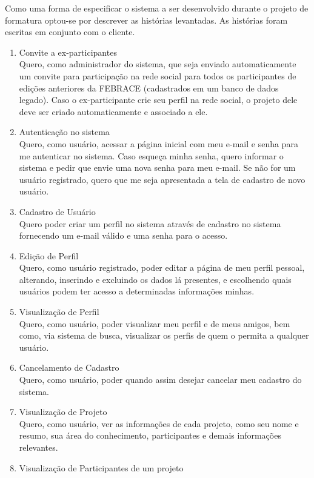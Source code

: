     Como uma forma de especificar o sistema a ser desenvolvido durante o projeto de formatura optou-se por descrever as histórias levantadas. As histórias foram escritas em conjunto com o cliente.

    \begin{enumerate}
      \item Convite a ex-participantes \\
        Quero, como administrador do sistema, que seja enviado automaticamente um convite para participação na rede social para todos os participantes de edições anteriores da FEBRACE (cadastrados em um banco de dados legado). Caso o ex-participante crie seu perfil na rede social, o projeto dele deve ser criado automaticamente e associado a ele.
      \item Autenticação no sistema \\
        Quero, como usuário, acessar a página inicial com meu e-mail e senha para me autenticar no sistema. Caso esqueça minha senha, quero informar o sistema e pedir que envie uma nova senha para meu e-mail. Se não for um usuário registrado, quero que me seja apresentada a tela de cadastro de novo usuário.
      \item Cadastro de Usuário \\
        Quero poder criar um perfil no sistema através de cadastro no sistema fornecendo um e-mail válido e uma senha para o acesso.
      \item Edição de Perfil \\
        Quero, como usuário registrado, poder editar a página de meu perfil pessoal, alterando, inserindo e excluindo os dados lá presentes, e escolhendo quais usuários podem ter acesso a determinadas informações minhas.
      \item Visualização de Perfil \\
        Quero, como usuário, poder visualizar meu perfil e de meus amigos, bem como, via sistema de busca, visualizar os perfis de quem o permita a qualquer usuário.
      \item Cancelamento de Cadastro \\
        Quero, como usuário, poder quando assim desejar cancelar meu cadastro do sistema.
      \item Visualização de Projeto \\
        Quero, como usuário, ver as informações de cada projeto, como seu nome e resumo, sua área do conhecimento, participantes e demais informações relevantes.
      \item Visualização de Participantes de um projeto \\

\end{enumerate}
